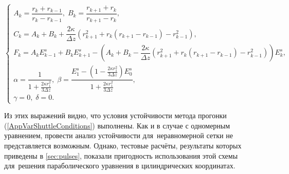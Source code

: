 \begin{equation}
\left\{
\begin{array}{l}
	A_k = \dfrac{r_k+r_{k-1}}{r_k-r_{k-1}}, \; B_k =\dfrac{r_{k+1}+r_k}{r_{k+1}-r_k}, \\[1em]
	C_k = A_k + B_k + \dfrac{2\kappa}{ \Delta z}\left( r_{k+1}^2 + r_k(r_{k+1}-r_{k-1})-r_{k-1}^2 \right), \\[1em]
	F_k = A_k E_{k-1}^s +  B_k E_{k+1}^s -
	      \left(A_k + B_k - \dfrac{2\kappa}{ \Delta z}\left( r_{k+1}^2 + r_k(r_{k+1}-r_{k-1})-r_{k-1}^2 \right)\right) E_k^s, \\[1em]
	\alpha = \dfrac{1}{1+\frac{2\kappa r_1^2}{3\Delta z}}, \;
	\beta = \dfrac{E_1^s - \left(1-\frac{2\kappa r_1^2}{3\Delta z}\right)E_0^s}{1+\frac{2\kappa r_1^2}{3\Delta z}}, \\[2em]
	\gamma = 0, \;
	\delta = 0.
\end{array}
\right.
\end{equation}

Из этих выражений видно, что условия устойчивости метода прогонки (\ref{AppVarShuttleConditions}) выполнены.
Как и в случае с одномерным уравнением, провести анализ устойчивости для~неравномерной сетки не представляется возможным.
Однако, тестовые расчёты, результаты которых приведены в \ref{sec:pulses}, показали пригодность использования этой схемы
для~решения параболического уравнения в цилиндрических координатах.


